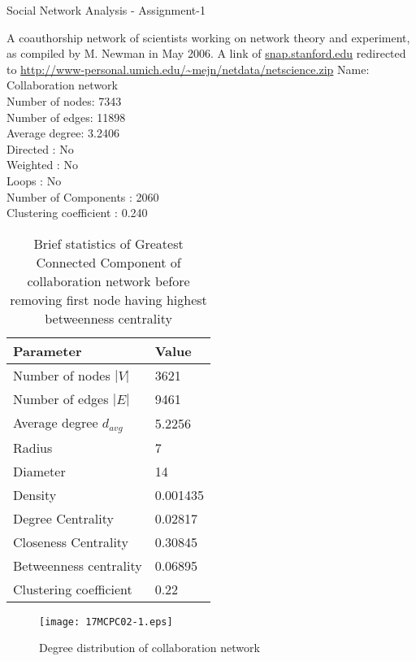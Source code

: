 \documentclass[10pt,a4paper]{article}
\begin{document}
\begin{center}
	Social Network Analysis - Assignment-1
\end{center}
A coauthorship network of scientists working on network theory and experiment, as compiled by M. Newman in May 2006. A link of \url{snap.stanford.edu} redirected to 
\url{http://www-personal.umich.edu/~mejn/netdata/netscience.zip} 
\vskip 2mm
\noindent 
Name: Collaboration network
\\
Number of nodes: 7343
\\
Number of edges: 11898
\\
Average degree:   3.2406
\\
Directed : No
\\
Weighted : No
\\
Loops : No
\\
Number of Components :  2060
\\
Clustering coefficient : 0.240 \\
\begin{table}[h]
	\centering
	\begin{tabular}{|l|l|}
	\hline 
	\textbf{Parameter}& \textbf{Value} \\ 
	\hline
	Number of nodes $|V|$ & 3621 \\
	\hline
	Number of edges $|E|$ & 9461 \\
	\hline
	Average degree $d_{avg}$ &    5.2256 \\
	\hline 
	Radius & 7 \\ 
	\hline
	Diameter & 14 \\ 
	\hline 
	Density &  0.001435 \\ 
	\hline 
	Degree Centrality & 0.02817 \\ 
	\hline 
	Closeness Centrality & 0.30845 \\ 
	\hline 
	Betweenness centrality & 0.06895 \\ 
	\hline 
	Clustering coefficient & 0.22 \\ 
	\hline 
\end{tabular} 
	\caption{Brief statistics of Greatest Connected Component of collaboration network before removing first node having highest betweenness centrality}
\end{table}


\begin{figure}[h]
	\centering
	\texttt{[image: 17MCPC02-1.eps]}
	\caption{Degree distribution of collaboration network}
\end{figure}	
\end{document}
